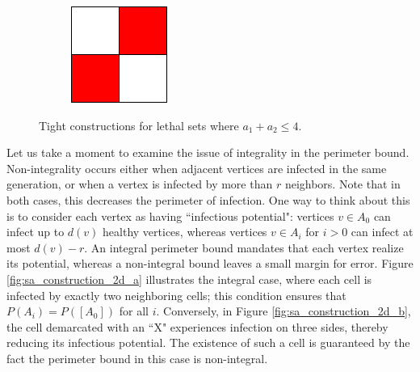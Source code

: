 \begin{figure}[]
\begin{subfigure}{0.1\textwidth}
\end{subfigure} \hfill%
\begin{subfigure}{0.06\textwidth}
	\includegraphics[width=\textwidth]{figures/1/2x2x1.pdf}
\end{subfigure}
\caption{Tight constructions for lethal sets where $a_1+a_2 \leq 4$.}
\label{fig:base_cases}
\end{figure} 

Let us take a moment to examine the issue of integrality in the perimeter bound. Non-integrality occurs either when adjacent vertices are infected in the same generation, or when a vertex is infected by more than $r$ neighbors. Note that in both cases, this decreases the perimeter of infection. One way to think about this is to consider each vertex as having ``infectious potential": vertices $v \in A_0$ can infect up to $d(v)$ healthy vertices, whereas vertices $v \in A_i$ for $i > 0$ can infect at most $d(v) - r$. An integral perimeter bound mandates that each vertex realize its potential, whereas a non-integral bound leaves a small margin for error. Figure \ref{fig:sa_construction_2d_a} illustrates the integral case, where each cell is infected by exactly two neighboring cells; this condition ensures that $P(A_i) = P([A_0])$ for all $i$. Conversely, in Figure \ref{fig:sa_construction_2d_b}, the cell demarcated with an ``X" experiences infection on three sides, thereby reducing its infectious potential. The existence of such a cell is guaranteed by the fact the perimeter bound in this case is non-integral. 

